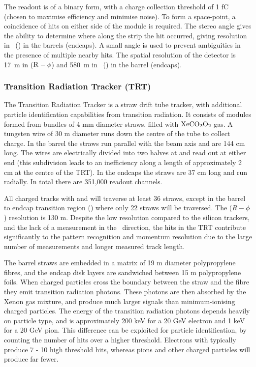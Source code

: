  The readout is of a binary form, with a charge collection threshold of 1
fC (chosen to maximise efficiency and minimise noise). To form a space-point, a
coincidence of hits on either side of the module is required. The stereo
angle gives the ability to determine where along the strip the hit occurred,
giving resolution in \z\ (\R) in the barrels (endcaps). A small angle is used to
prevent ambiguities in the presence of multiple nearby hits. The spatial
resolution of the detector is 17~\micro m in ($\rm{R}-\phi$) and 580~\micro m in
\z\ (\R) in the barrel (endcaps).

\subsubsection{Transition Radiation Tracker (TRT)}
\label{sec:Detector-TRT}

The Transition Radiation Tracker is a straw drift tube tracker, with additional
particle identification capabilities from transition radiation. It consists of
modules formed from bundles of 4 mm diameter straws, filled with
$\rm{XeCO_{2}O_{2}}$ gas. A tungsten wire of 30 \micro m diameter runs down
the centre of the tube to collect charge. In the barrel the straws run parallel
with the beam axis and are 144 cm long. The wires are electrically divided into two halves at
 and read out at either end (this subdivision leads to an
inefficiency along a length of approximately 2 cm at the centre of the TRT). In
the endcaps the straws are 37 cm long and run radially. In total there are
351,000 readout channels.

All charged tracks with  and  will traverse at least 36
straws, except in the barrel to endcap transition region ()
where only 22 straws will be traversed. The ($R-\phi$) resolution is 130 \micro
m. Despite the low resolution compared to the silicon trackers, and the lack of
a measurement in the \z\ direction, the hits in the TRT contribute significantly
to the pattern recognition and momentum resolution due to the large number of
measurements and longer measured track length.

The barrel straws are embedded in a matrix of 19 \micro m diameter polypropylene
fibres, and the endcap disk layers are sandwiched between 15 \micro m
polypropylene foils. When charged particles cross the boundary between the straw
and the fibre they emit
transition radiation photons. These photons are then absorbed by the Xenon gas
mixture, and produce much larger signals than minimum-ionising
charged particles. The energy of the transition radiation photons depends
heavily on particle type, and is approximately 200 keV for a 20 GeV electron and
1 keV for a 20 GeV pion. This difference can be exploited for particle
identification, by counting the number of hits over a higher threshold.
Electrons with  typically produce 7 - 10 high threshold hits, whereas
pions and other charged particles will produce far fewer.

